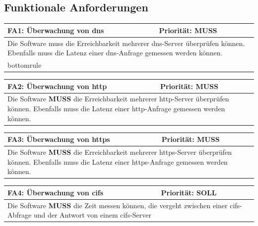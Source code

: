 \documentclass[titlepage]{report}
\begin{document}
\subsection*{Funktionale Anforderungen}
\begin{center}
\begin{tabular}{p{}>{\raggedleft\arraybackslash}p{}}\toprule
    \textbf{FA1: Überwachung von \gls{dns} } & \textbf{Priorität: MUSS} \\\midrule
	\multicolumn{2}{p{\textwidth-\tabcolsep}}{%
        Die Software muss die Erreichbarkeit mehrerer
        \gls{dns}\hyp{}Server überprüfen können. Ebenfalls muss die
        Latenz einer \gls{dns}\hyp{}Anfrage gemessen werden können.}\\bottomrule
\end{tabular}
\end{center}
\begin{center}
\begin{tabular}{p{}>{\raggedleft\arraybackslash}p{}}\toprule
    \textbf{FA2: Überwachung von \gls{http} } & \textbf{Priorität: MUSS} \\\midrule
	\multicolumn{2}{p{\textwidth-\tabcolsep}}{%
        Die Software \textbf{MUSS} die Erreichbarkeit mehrerer
        \gls{http}\hyp{}Server überprüfen können. Ebenfalls muss die
        Latenz einer \gls{http}\hyp{}Anfrage gemessen werden können.}\\\bottomrule
\end{tabular}
\end{center}
\begin{center}
\begin{tabular}{p{}>{\raggedleft\arraybackslash}p{}}\toprule
    \textbf{FA3: Überwachung von \gls{https} } & \textbf{Priorität: MUSS} \\\midrule
	\multicolumn{2}{p{\textwidth-\tabcolsep}}{%
        Die Software \textbf{MUSS} die Erreichbarkeit mehrerer
        \gls{https}\hyp{}Server überprüfen können. Ebenfalls muss die
        Latenz einer \gls{https}\hyp{}Anfrage gemessen werden können.}\\\bottomrule
\end{tabular}
\end{center}
\begin{center}
\begin{tabular}{p{}>{\raggedleft\arraybackslash}p{}}\toprule
    \textbf{FA4: Überwachung von \gls{cifs} } & \textbf{Priorität: SOLL} \\\midrule
	\multicolumn{2}{p{\textwidth-\tabcolsep}}{%
    Die Software \textbf{MUSS} die Zeit messen können, die vergeht
    zwischen einer \gls{cifs}-Abfrage und der Antwort von einem
    \gls{cifs}-Server}\\\bottomrule
\end{tabular}
\end{center}
\end{document}
